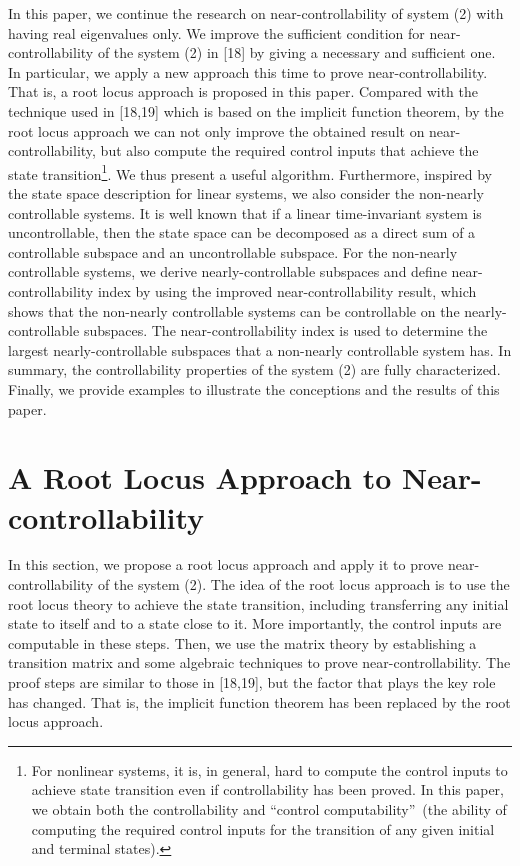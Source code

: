 \documentclass[journal,a4paper,12pt,onecolumn]{IEEEtran}
\begin{document}
In this paper, we continue the research on near-controllability of system
(2) with  having real eigenvalues only. We improve the sufficient
condition for near-controllability of the system (2) in [18] by giving a
necessary and sufficient one. In particular, we apply a new approach this
time to prove near-controllability. That is, a root locus approach is
proposed in this paper. Compared with the technique used in [18,19] which is
based on the implicit function theorem, by the root locus approach we can
not only improve the obtained result on near-controllability, but also
compute the required control inputs that achieve the state transition\footnote{For nonlinear systems, it is, in general, hard to compute the control inputs
to achieve state transition even if controllability has been proved. In this
paper, we obtain both the controllability and \textquotedblleft control
computability\textquotedblright\ (the ability of computing the required
control inputs for the transition of any given initial and terminal states).}. We thus present a useful algorithm. Furthermore, inspired by the state
space description for linear systems, we also consider the non-nearly
controllable systems. It is well known that if a linear time-invariant
system is uncontrollable, then the state space can be decomposed as a direct
sum of a controllable subspace and an uncontrollable subspace. For the
non-nearly controllable systems, we derive nearly-controllable subspaces and
define near-controllability index by using the improved near-controllability
result, which shows that the non-nearly controllable systems can be
controllable on the nearly-controllable subspaces. The near-controllability
index is used to determine the largest nearly-controllable subspaces that a
non-nearly controllable system has. In summary, the controllability
properties of the system (2) are fully characterized. Finally, we provide
examples to illustrate the conceptions and the results of this paper.



\section{A Root Locus Approach to Near-controllability}

In this section, we propose a root locus approach and apply it to prove
near-controllability of the system (2). The idea of the root locus approach
is to use the root locus theory to achieve the state transition, including
transferring any initial state to itself and to a state close to it. More
importantly, the control inputs are computable in these steps. Then, we use
the matrix theory by establishing a transition matrix and some algebraic
techniques to prove near-controllability. The proof steps are similar to
those in [18,19], but the factor that plays the key role has changed. That
is, the implicit function theorem has been replaced by the root locus
approach.
\end{document}
